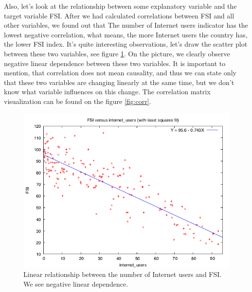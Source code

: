 \documentclass{article}
\begin{document}
Also, let's look at the relationship between some explanatory variable and the target variable FSI. After we had calculated correlations between FSI and all other variables, we found out that The number of Internet users indicator has the lowest negative correlation, what means, the more Internet users the country has, the lower FSI index. It's quite interesting observations, let's draw the scatter plot between these two variables, see figure \ref{fig:fsi_internet}. On the picture, we clearly observe negative linear dependence between these two variables. It is important to mention, that correlation does not mean causality, and thus we can state only that these two variables are changing linearly at the same time, but we don't know what variable influences on this change. The correlation matrix visualization can be found on the figure \ref{fig:corr}. 

\begin{figure}[H]
\begin{center}
\includegraphics[width=.8\textwidth]{fsi_internet}
\caption{Linear relationship between the number of Internet users and FSI. We see negative linear dependence.}
\label{fig:fsi_internet}
\end{center}
\end{figure}
\end{document}
